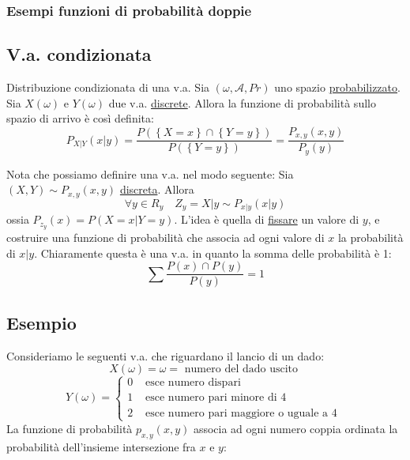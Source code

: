 \subsubsection*{Esempi funzioni di probabilità doppie}
\subsection{V.a. condizionata}
\begin{definizione}{Distribuzione condizionata di una v.a.}
	Sia $ \left(\omega , \mathcal{A}, Pr\right) $ uno spazio \underline{probabilizzato}. Sia $ X\left(\omega \right) $ e $ Y\left(\omega \right) $ due v.a. \underline{discrete}. Allora la funzione di probabilità sullo spazio di arrivo è così definita:
	\[
		P_{X | Y} \left(x|y\right) = \frac{P\left(\left\{ X = x\right\} \cap \left\{Y = y\right\}\right)}{P\left(\left\{Y = y\right\}\right)} = \frac{P_{x,y}\left(x,y\right)}{ P_{y} \left(y\right)}
	\]
\end{definizione}
Nota che possiamo definire una v.a. nel modo seguente:
\vskip3mm
Sia $ \left(X, Y\right) \sim P_{x,y} \left(x,y\right) $ \underline{discreta}. Allora
\[
	\forall  y \in  R_y \quad Z_y =  X | y \sim P_{x|y} \left(x | y\right)
\]
ossia $ P_{z_y} \left(x\right) = P\left(X = x | Y = y\right) $. L'idea è quella di \underline{fissare} un valore di $ y $, e costruire una funzione di probabilità che associa ad ogni valore di $ x $ la probabilità di $ x | y $. Chiaramente questa è una v.a. in quanto la somma delle probabilità è 1:
\[
	\sum \frac{P\left(x\right) \cap   P\left(y\right)}{P\left(y\right)} = 1
\]

\subsection{Esempio}
\label{Esempio dado}
Consideriamo le seguenti v.a. che riguardano il lancio di un dado:
\[
	X \left(\omega \right) = \omega  = \text{ numero del dado uscito }
\]
\[
	Y\left(\omega \right) =
	\begin{cases}
		0 & \text{ esce numero dispari }                    \\
		1 & \text{ esce numero pari minore di 4 }           \\
		2 & \text{ esce numero pari maggiore o uguale a 4 }
	\end{cases}
\]
La funzione di probabilità $ p_{x,y} \left(x,y\right) $ associa ad ogni numero coppia ordinata la probabilità dell'insieme intersezione fra $ x $ e $ y $:

